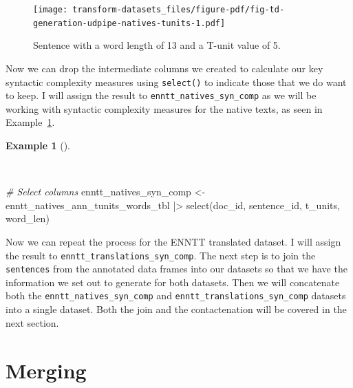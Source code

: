 \documentclass[
  letterpaper,
  DIV=11,
  numbers=noendperiod]{scrreport}
\newenvironment{Shaded}{\begin{snugshade}}{\end{snugshade}}
\newcommand{\CommentTok}[1]{\textcolor[rgb]{0.00,0.00,0.00}{\textit{#1}}}
\newcommand{\FunctionTok}[1]{\textcolor[rgb]{0.00,0.00,0.00}{#1}}
\newcommand{\NormalTok}[1]{\textcolor[rgb]{0.00,0.00,0.00}{#1}}
\newcommand{\OtherTok}[1]{\textcolor[rgb]{0.00,0.00,0.00}{#1}}
\newcommand{\SpecialCharTok}[1]{\textcolor[rgb]{0.00,0.00,0.00}{#1}}
\theoremstyle{definition}
\newtheorem{example}{Example}[chapter]
\theoremstyle{remark}
\begin{document}
\begin{figure}[H]

{\centering \texttt{[image: transform-datasets\_files/figure-pdf/fig-td-generation-udpipe-natives-tunits-1.pdf]}

}

\caption{\label{fig-td-generation-udpipe-natives-tunits}Sentence with a
word length of 13 and a T-unit value of 5.}

\end{figure}

Now we can drop the intermediate columns we created to calculate our key
syntactic complexity measures using \texttt{select()} to indicate those
that we do want to keep. I will assign the result to
\texttt{enntt\_natives\_syn\_comp} as we will be working with syntactic
complexity measures for the native texts, as seen in
Example~\ref{exm-td-generation-udpipe-natives-tunits-words-select}.

\begin{example}[]\protect\hypertarget{exm-td-generation-udpipe-natives-tunits-words-select}{}\label{exm-td-generation-udpipe-natives-tunits-words-select}

~

\begin{Shaded}
\begin{Highlighting}[]
\CommentTok{\# Select columns}
\NormalTok{enntt\_natives\_syn\_comp }\OtherTok{\textless{}{-}} 
\NormalTok{  enntt\_natives\_ann\_tunits\_words\_tbl }\SpecialCharTok{|\textgreater{}}
  \FunctionTok{select}\NormalTok{(doc\_id, sentence\_id, t\_units, word\_len)}
\end{Highlighting}
\end{Shaded}

\end{example}

Now we can repeat the process for the ENNTT translated dataset. I will
assign the result to \texttt{enntt\_translations\_syn\_comp}. The next
step is to join the \texttt{sentences} from the annotated data frames
into our datasets so that we have the information we set out to generate
for both datasets. Then we will concatenate both the
\texttt{enntt\_natives\_syn\_comp} and
\texttt{enntt\_translations\_syn\_comp} datasets into a single dataset.
Both the join and the contactenation will be covered in the next
section.

\hypertarget{sec-td-merging}{%
\section{Merging}\label{sec-td-merging}}
\end{document}
